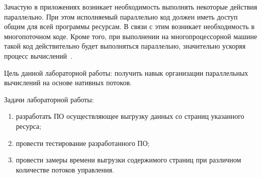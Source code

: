 
Зачастую в приложениях возникает необходимость выполнять некоторые действия параллельно. При этом исполняемый параллельно код должен иметь доступ общим для всей программы ресурсам. В связи с этим возникает необходимость в многопоточном коде. Кроме того, при выполнении на многопроцессорной машине такой код действительно будет выполняться параллельно, значительно ускоряя процесс вычислений~\cite{Tanenbaum}.

Цель данной лабораторной работы: получить навык организации параллельных вычислений на основе нативных потоков.

Задачи лабораторной работы:
\begin{enumerate}[label={\arabic*)}]
	\item разработать ПО осуществляющее выгрузку данных со страниц указанного ресурса;
	\item провести тестирование разработанного ПО;
	\item провести замеры времени выгрузки содержимого страниц при различном количестве потоков управления.
\end{enumerate}
\clearpage